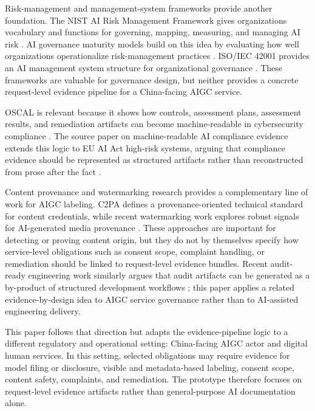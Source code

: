 \documentclass[10pt,journal]{IEEEtran}
\begin{document}
Risk-management and management-system frameworks provide another foundation. The NIST AI Risk Management Framework gives organizations vocabulary and functions for governing, mapping, measuring, and managing AI risk \cite{nist2023airmf}. AI governance maturity models build on this idea by evaluating how well organizations operationalize risk-management practices \cite{dotan2024evolving}. ISO/IEC 42001 provides an AI management system structure for organizational governance \cite{iso42001}. These frameworks are valuable for governance design, but neither provides a concrete request-level evidence pipeline for a China-facing AIGC service.

OSCAL is relevant because it shows how controls, assessment plans, assessment results, and remediation artifacts can become machine-readable in cybersecurity compliance \cite{nistOSCAL}. The source paper on machine-readable AI compliance evidence extends this logic to EU AI Act high-risk systems, arguing that compliance evidence should be represented as structured artifacts rather than reconstructed from prose after the fact \cite{ugarte2026machineReadableAICompliance}.

Content provenance and watermarking research provides a complementary line of work for AIGC labeling. C2PA defines a provenance-oriented technical standard for content credentials, while recent watermarking work explores robust signals for AI-generated media provenance \cite{c2pa2024spec,xu2024invismark}. These approaches are important for detecting or proving content origin, but they do not by themselves specify how service-level obligations such as consent scope, complaint handling, or remediation should be linked to request-level evidence bundles. Recent audit-ready engineering work similarly argues that audit artifacts can be generated as a by-product of structured development workflows \cite{koch2026agilev}; this paper applies a related evidence-by-design idea to AIGC service governance rather than to AI-assisted engineering delivery.

This paper follows that direction but adapts the evidence-pipeline logic to a different regulatory and operational setting: China-facing AIGC actor and digital human services. In this setting, selected obligations may require evidence for model filing or disclosure, visible and metadata-based labeling, consent scope, content safety, complaints, and remediation. The prototype therefore focuses on request-level evidence artifacts rather than general-purpose AI documentation alone.
\end{document}
